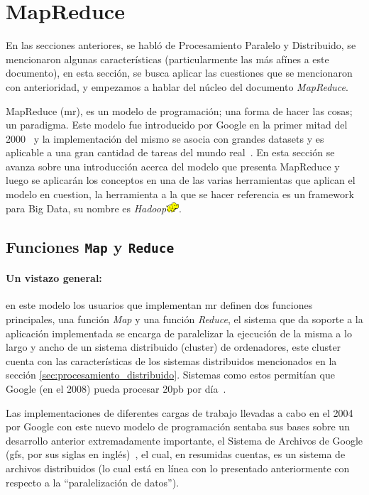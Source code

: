 \section{MapReduce}
\label{ssec:mapreduce}

En las secciones anteriores, se habló de Procesamiento Paralelo y Distribuido,
se mencionaron algunas características (particularmente las más afínes a este
documento), en esta sección, se busca aplicar las cuestiones que se mencionaron
con anterioridad, y empezamos a hablar del núcleo del documento
\textit{MapReduce}.

MapReduce (\acrshort{mr}), es un modelo de programación; una forma de hacer las cosas; un
paradigma. Este modelo fue introducido por Google en la primer mitad del
2000~\cite{dean2004} y la implementación del mismo se asocia con grandes 
\glspl{dataset} y es
aplicable a una gran cantidad de tareas del mundo real~\cite{dean2008}. En esta
sección se avanza sobre una introducción acerca del modelo que presenta
MapReduce y 
luego se aplicarán los conceptos en una de las varias herramientas que aplican
el modelo en cuestion, la herramienta a la que se hacer referencia es un 
\Gls{framework} para Big Data, su nombre es 
\textit{Hadoop}\includegraphics[height=10pt]{figuras/logos/hadoop_logo.png}.

\subsection{Funciones \texttt{Map} y \texttt{Reduce}}

\paragraph{Un vistazo general:}
en este modelo los usuarios que implementan \acrshort{mr} definen dos
funciones principales, una función \textit{Map} y una función \textit{Reduce},
el sistema que da soporte a la aplicación implementada se encarga de
paralelizar la ejecución de la misma a lo largo y ancho de un sistema
distribuido (\gls{cluster}) de ordenadores, este \gls{cluster} cuenta con las
características de los sistemas distribuidos mencionados en la sección
\ref{sec:procesamiento_distribuido}. Sistemas como estos permitían que Google
(en el 2008) pueda procesar 20\acrshort{pb} por día~\cite{dean2008}.

Las implementaciones de diferentes cargas de trabajo llevadas a cabo en el 
2004 por Google con este nuevo modelo de programación sentaba sus bases sobre un
desarrollo anterior extremadamente importante, el Sistema de Archivos de
Google (\acrshort{gfs}, por sus siglas en inglés)~\cite{ghemawat2003}, el cual,
en resumidas cuentas, es un sistema de archivos distribuidos (lo cual está en
línea con lo presentado anteriormente con respecto a la ``paralelización de datos'').



